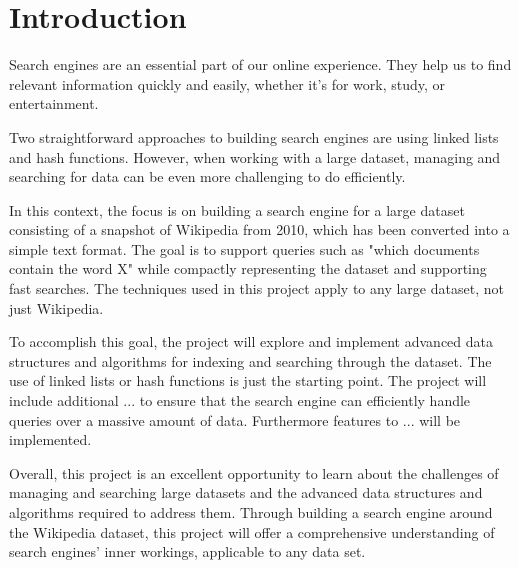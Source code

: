 \chapter{Introduction}
Search engines are an essential part of our online experience. They help us to find relevant information quickly and easily, whether it's for work, study, or entertainment. 

Two straightforward approaches to building search engines are using linked lists and hash functions. However, when working with a large dataset, managing and searching for data can be even more challenging to do efficiently. 

In this context, the focus is on building a search engine for a large dataset consisting of a snapshot of Wikipedia from 2010, which has been converted into a simple text format. The goal is to support queries such as "which documents contain the word X" while compactly representing the dataset and supporting fast searches. The techniques used in this project apply to any large dataset, not just Wikipedia.

To accomplish this goal, the project will explore and implement advanced data structures and algorithms for indexing and searching through the dataset. The use of linked lists or hash functions is just the starting point. The project will include additional ... to ensure that the search engine can efficiently handle queries over a massive amount of data. Furthermore features to ... will be implemented. 

Overall, this project is an excellent opportunity to learn about the challenges of managing and searching large datasets and the advanced data structures and algorithms required to address them. Through building a search engine around the Wikipedia dataset, this project will offer a comprehensive understanding of search engines' inner workings, applicable to any data set.
